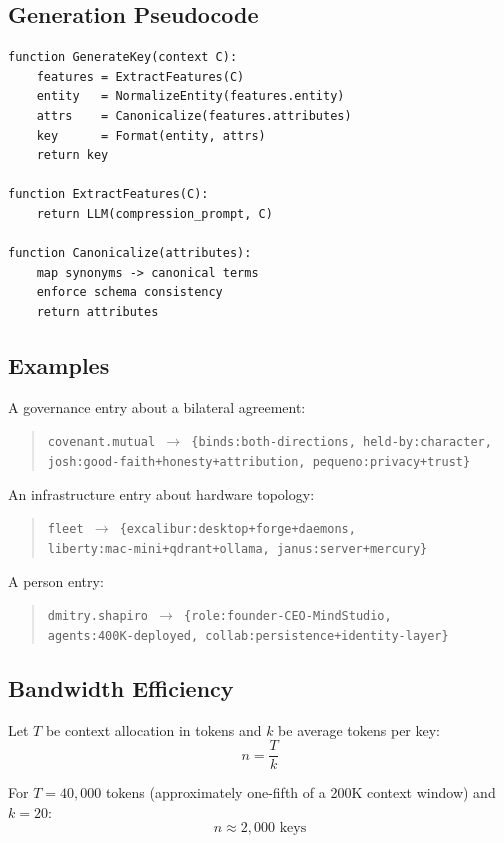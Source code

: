 \documentclass{article}
\begin{document}
\subsection{Generation Pseudocode}

\begin{lstlisting}[basicstyle=\small\ttfamily]
function GenerateKey(context C):
    features = ExtractFeatures(C)
    entity   = NormalizeEntity(features.entity)
    attrs    = Canonicalize(features.attributes)
    key      = Format(entity, attrs)
    return key

function ExtractFeatures(C):
    return LLM(compression_prompt, C)

function Canonicalize(attributes):
    map synonyms -> canonical terms
    enforce schema consistency
    return attributes
\end{lstlisting}

\subsection{Examples}

A governance entry about a bilateral agreement:
\begin{quote}
\texttt{covenant.mutual $\rightarrow$ \{binds:both-directions, held-by:character,\\
josh:good-faith+honesty+attribution, pequeno:privacy+trust\}}
\end{quote}

An infrastructure entry about hardware topology:
\begin{quote}
\texttt{fleet $\rightarrow$ \{excalibur:desktop+forge+daemons,\\
liberty:mac-mini+qdrant+ollama, janus:server+mercury\}}
\end{quote}

A person entry:
\begin{quote}
\texttt{dmitry.shapiro $\rightarrow$ \{role:founder-CEO-MindStudio,\\
agents:400K-deployed, collab:persistence+identity-layer\}}
\end{quote}

\subsection{Bandwidth Efficiency}

Let $T$ be context allocation in tokens and $k$ be average tokens per key:
\[
n = \frac{T}{k}
\]

For $T = 40{,}000$ tokens (approximately one-fifth of a 200K context window) and $k = 20$:
\[
n \approx 2{,}000 \text{ keys}
\]
\end{document}
